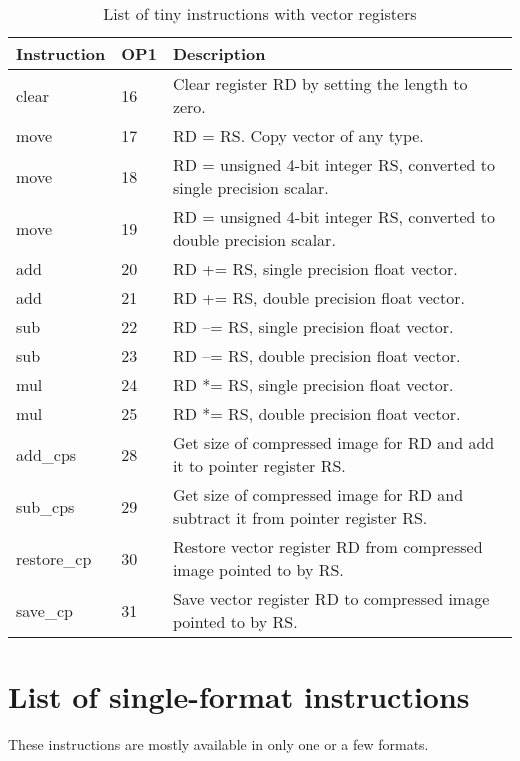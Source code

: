 \documentclass[forwardcom.tex]{subfiles}
\begin{document}
\begin{longtable} {|p{20mm}|p{10mm}|p{100mm}|}
\caption{List of tiny instructions with vector registers}
\label{table:tinyInstructionsVector}  \\
\endfirsthead
\endhead
\hline
\bfseries Instruction & \bfseries OP1 & \bfseries Description \\
\hline
clear         & 16 & Clear register RD by setting the length to zero. \\
move          & 17 & RD = RS. Copy vector of any type. \\
move          & 18 & RD = unsigned 4-bit integer RS, converted to single precision scalar. \\
move          & 19 & RD = unsigned 4-bit integer RS, converted to double precision scalar. \\
add           & 20 & RD += RS, single precision float vector. \\
add           & 21 & RD += RS, double precision float vector. \\
sub           & 22 & RD --= RS, single precision float vector. \\
sub           & 23 & RD --= RS, double precision float vector. \\
mul           & 24 & RD *= RS, single precision float vector. \\
mul           & 25 & RD *= RS, double precision float vector. \\
add\_cps      & 28 & Get size of compressed image for RD and add it to pointer register RS. \\
sub\_cps      & 29 & Get size of compressed image for RD and subtract it from pointer register RS. \\
restore\_cp   & 30 & Restore vector register RD from compressed image pointed to by RS. \\
save\_cp      & 31 & Save vector register RD to compressed image pointed to by RS. \\
\hline
\end{longtable}
\vspace{2mm}

\section{List of single-format instructions}
These instructions are mostly available in only one or a few formats.
\end{document}

